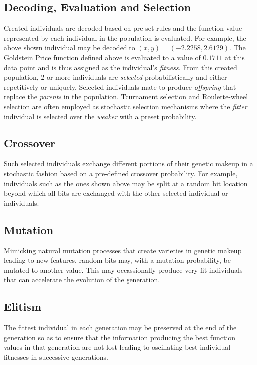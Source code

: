 \documentclass[ExampleMasters.tex]{subfiles}
\begin{document}
		\subsection{Decoding, Evaluation and Selection}
			Created individuals are decoded based on pre-set rules and the function value represented by each individual in the population is evaluated. For example, the above shown individual may be decoded to $(x,y) = (-2.2258, 2.6129)$. The Goldstein Price function defined above is evaluated to a value of $0.1711$ at this data point and is thus assigned as the individual's \textit{fitness}. From this created population, 2 or more individuals are \textit{selected} probabilistically and either repetitively or uniquely. Selected individuals mate to produce \textit{offspring} that replace the \textit{parents} in the population. Tournament selection and Roulette-wheel selection are often employed as stochastic selection mechanisms where the \textit{fitter} individual is selected over the \textit{weaker} with a preset probability.\\
		\subsection{Crossover}
			Such selected individuals exchange different portions of their genetic makeup in a stochastic fashion based on a pre-defined crossover probability. For example, individuals such as the ones shown above may be split at a random bit location beyond which all bits are exchanged with the other selected individual or individuals.\\ 
		\subsection{Mutation}
			Mimicking natural mutation processes that create varieties in genetic makeup leading to new features, random bits may, with a mutation probability, be mutated to another value. This may occassionally produce very fit individuals that can accelerate the evolution of the generation.\\
		\subsection{Elitism}
			The fittest individual in each generation may be preserved at the end of the generation so as to ensure that the information producing the best function values in that generation are not lost leading to oscillating best individual fitnesses in successive generations.\\
\end{document}
